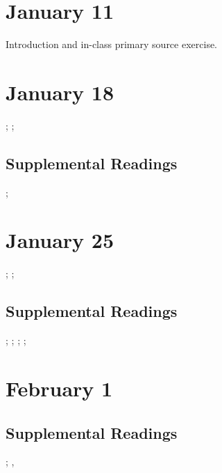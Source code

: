 \documentclass[11pt]{article}
\begin{document}
\small
\let\realeverypar\everypar
\realeverypar{\the\myeverypar\the\everypar}%
\newtoks\everypar %
\everypar{}
\newtoks\myeverypar \myeverypar{}

\myeverypar{\hangindent=1cm \small}

\section{January 11}

Introduction and in-class primary source exercise.

\cite{Turkle:1984hack}


\section{January 18}

\cite{Scott:1986ik}; \cite{Cowan:1976wda}; 
\cite{Oldenziel:1997to}

\subsection{Supplemental Readings}

\cite{Cowan:1983vm}; \cite{Lerman:1997ui}


\section{January 25}

\cite{Bray:2007cb}; \cite{Kleif:2003wg}; \cite{Fischer:1988wl}

\subsection{Supplemental Readings}

\cite{Wajcman:2000vq}; \cite{Bray:1997wl}; \cite{Edwards:1990ua}; \cite{Pirsig:1974vs}; \cite{Ullman:1997vv}

\section{February 1}

\cite{Oldenziel:1999vk}

\subsection{Supplemental Readings}
\cite{Maines:1999uw}; \cite{Rossiter:1982vn}, \cite{Tichi:1987wb}
\end{document}

